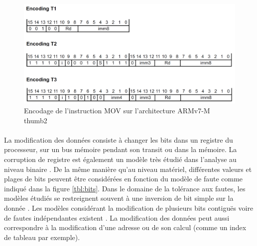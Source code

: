                 \begin{figure}[ht]
                    \centering
                    \includegraphics[scale=.32]{ch2-background/img/armv7-encoding.png}
                    \caption{Encodage de l'instruction MOV sur l'architecture ARMv7-M thumb2}
                    \label{fig:armv7-mov-encoding}
                \end{figure}
                
                \paragraph{}
                La modification des données consiste à changer les bits dans un registre du processeur, sur un bus mémoire pendant son transit ou dans la mémoire. La corruption de registre est également un modèle très étudié dans l'analyse au niveau binaire \cite{Blomer/CCS03, Verbauwhede/FDTC11}.
                De la même manière qu'au niveau matériel, différentes valeurs et plages de bits peuvent être considérées en fonction du  modèle de faute comme indiqué dans la figure \ref{tbl:bits}.
                Dans le domaine de la tolérance aux fautes, les modèles étudiés se restreignent souvent à une inversion de bit simple sur la donnée \cite{lu2015llfi, sharma2013towards, van2014evaluating, Georgakoudis/ICHPCNSA17, le2018resilience}. 
                Les modèles considérant la modification de plusieurs bits contiguës voire de fautes indépendantes existent \cite{CERN07}.
                La modification des données peut aussi correspondre à la modification d'une adresse ou de son calcul (comme un index de tableau par exemple).
                
